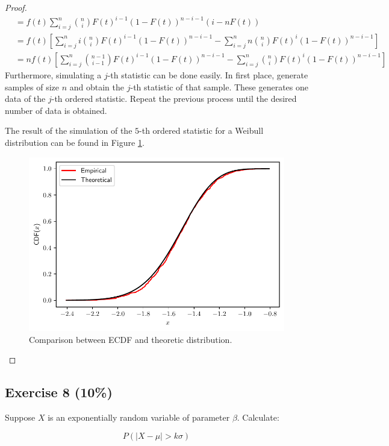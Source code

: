 \documentclass[11pt]{article}
\theoremstyle{definition}
\theoremstyle{remark}
\theoremstyle{remark}
\begin{document}
\begin{proof}
\begin{align*}
               &= f(t) \sum_{i=j}^n \binom{n}{i}F(t)^{i-1}(1 - F(t))^{n-i-1}
                 (i - nF(t)) \\
               &= f(t) \left[\sum_{i=j}^n i\binom{n}{i} F(t)^{i-1}(1 - F(t))^{n -i-1} -
                 \sum_{i=j}^n n \binom{n}{i} F(t)^i(1 - F(t))^{n - i - 1}\right] \\
               &= nf(t) \left[\sum_{i=j}^n \binom{n-1}{i-1}F(t)^{i-1}(1 - F(t))^{n -i-1} -
                  \sum_{i=j}^n \binom{n}{i} F(t)^i(1 - F(t))^{n - i - 1}\right]
  \end{align*}
  Furthermore, simulating a $j$-th statistic can be done easily. In
  first place, generate samples of size $n$ and obtain the $j$-th
  statistic of that sample. These generates one data of the $j$-th
  ordered statistic. Repeat the previous process until the desired
  number of data is obtained.

  The result of the simulation of the $5$-th ordered statistic for a
  Weibull distribution can be found in Figure \ref{fig:ex7}.
  \begin{figure}[H]
    \centering
    \includegraphics[scale=0.5]{../figs/order.pdf}
    \caption{Comparison between ECDF and theoretic distribution.}
    \label{fig:ex7}
  \end{figure}
\end{proof}

\subsection*{Exercise 8 (10\%)}
Suppose $X$ is an exponentially random variable of parameter
$\beta$. Calculate:

$$P(|X-\mu|>k \sigma)$$
\end{document}
